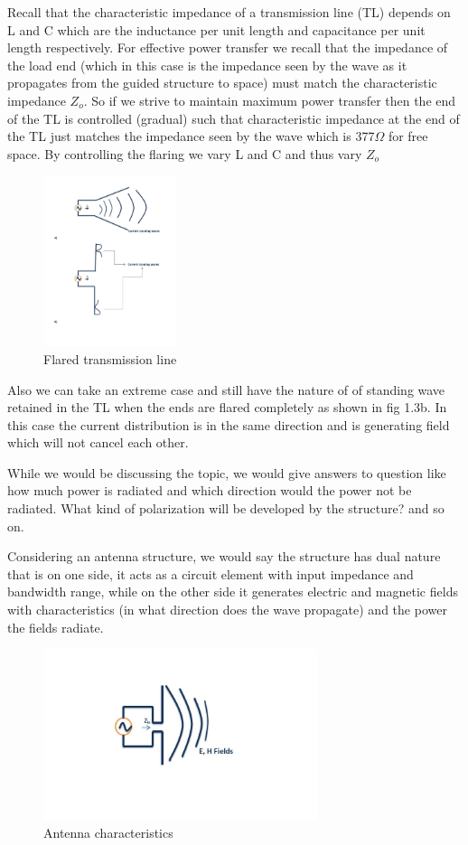 Recall that the characteristic impedance of a transmission line (TL) depends on L and C which are the inductance per unit length and capacitance per unit length respectively. For effective power transfer we recall that the impedance of the load end (which in this case is the impedance seen by the wave as it propagates from the guided structure to space) must match the characteristic impedance $Z_o$. So if we strive to maintain maximum power transfer then the end of the TL is controlled (gradual) such that characteristic impedance at the end of the TL just matches the impedance seen by the wave which is 377$\Omega$ for free space.
By controlling the flaring we vary L and C and thus vary $Z_o$
\begin{figure}
\centering
\includegraphics[height=5cm]{./graphics/fig_2}
\caption{Flared transmission line}
\end{figure}
Also we can take an extreme case and still have the nature of of standing wave retained in the TL when the ends are flared completely as shown in fig 1.3b. In this case the current distribution is in the same direction and is generating field which will not cancel each other.

While we would be discussing the topic, we would give answers to question like how much power is radiated and which direction would the power not be radiated. What kind of polarization will be developed by the structure? and so on.

Considering an antenna structure, we would say the structure has dual nature that is on one side, it acts as a circuit element with input impedance and bandwidth range, while on the other side it generates electric and magnetic fields with characteristics (in what direction does the wave propagate) and the power the fields radiate.
\begin{figure}
\centering
\includegraphics[height=5cm]{./graphics/fig_3}
\caption{Antenna characteristics}
\end{figure}

